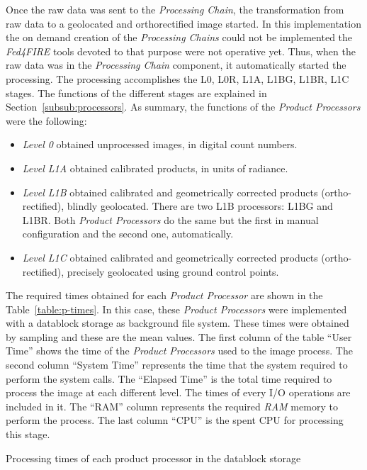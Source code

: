 Once the raw data was sent to the \emph{Processing Chain}, the transformation from
raw data to a geolocated and orthorectified image started. In this implementation the
on demand creation of the \emph{Processing Chains} could not be implemented the
\emph{Fed4FIRE}  tools devoted to that purpose were not operative yet.
Thus, when the raw data was in  the \emph{Processing Chain} component, it automatically started the processing. The processing accomplishes the L0, L0R,
L1A, L1BG, L1BR, L1C stages. 
The functions of the different stages are explained
in Section~\ref{subsub:processors}. As summary, the functions of the
\emph{Product Processors} were the following:
\begin{itemize}
\item \emph{Level 0} obtained unprocessed images, in digital count numbers.
\item \emph{Level L1A} obtained calibrated products, in units of radiance.
\item \emph{Level L1B} obtained calibrated and geometrically corrected products
  (ortho-rectified), blindly geolocated. There are two L1B processors: L1BG and
  L1BR. Both \emph{Product Processors} do the same but the first in manual
  configuration and the second one, automatically.
\item \emph{Level L1C} obtained calibrated and geometrically corrected products (ortho-rectified), precisely geolocated using ground control points.
\end{itemize}


The required times obtained for
each \emph{Product Processor} are shown in the Table~\ref{table:p-times}. In
this case, these \emph{Product Processors} were implemented with a datablock
storage as background file system. These
times were obtained by sampling and these are the mean values. The first column of the table ``User Time'' shows the  time of the
\emph{Product Processors} used to the image process. The second column ``System
Time'' represents the time that the system required to perform the system calls. The ``Elapsed Time'' is
the total time required to process the image at each different level. The times of every I/O operations are
included in it. The ``RAM'' column represents the required \emph{RAM} memory to
perform the process. The last column ``CPU'' is the spent \ac{CPU} for
processing this stage.

\begin{table}[!h]
  \centering
  {\small
  
  }
  \caption{Processing times of each product processor in the datablock storage}
  \label{table:p-times}
\end{table}

